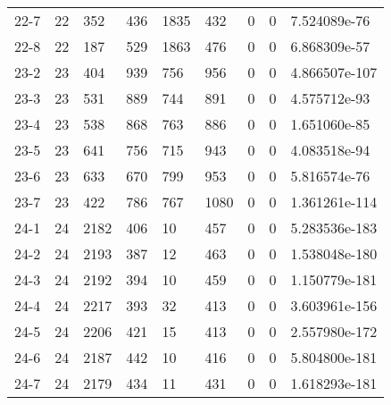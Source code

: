 \documentclass[11pt]{article}
\begin{document}
\begin{tabular}{r|llllllll}
	22-7 & 22            &  352          & 436           & 1835          &  432          & 0             & 0             &  7.524089e-76\\
	22-8 & 22            &  187          & 529           & 1863          &  476          & 0             & 0             &  6.868309e-57\\
	23-2 & 23            &  404          & 939           &  756          &  956          & 0             & 0             & 4.866507e-107\\
	23-3 & 23            &  531          & 889           &  744          &  891          & 0             & 0             &  4.575712e-93\\
	23-4 & 23            &  538          & 868           &  763          &  886          & 0             & 0             &  1.651060e-85\\
	23-5 & 23            &  641          & 756           &  715          &  943          & 0             & 0             &  4.083518e-94\\
	23-6 & 23            &  633          & 670           &  799          &  953          & 0             & 0             &  5.816574e-76\\
	23-7 & 23            &  422          & 786           &  767          & 1080          & 0             & 0             & 1.361261e-114\\
	24-1 & 24            & 2182          & 406           &   10          &  457          & 0             & 0             & 5.283536e-183\\
	24-2 & 24            & 2193          & 387           &   12          &  463          & 0             & 0             & 1.538048e-180\\
	24-3 & 24            & 2192          & 394           &   10          &  459          & 0             & 0             & 1.150779e-181\\
	24-4 & 24            & 2217          & 393           &   32          &  413          & 0             & 0             & 3.603961e-156\\
	24-5 & 24            & 2206          & 421           &   15          &  413          & 0             & 0             & 2.557980e-172\\
	24-6 & 24            & 2187          & 442           &   10          &  416          & 0             & 0             & 5.804800e-181\\
	24-7 & 24            & 2179          & 434           &   11          &  431          & 0             & 0             & 1.618293e-181\\
\end{tabular}
\end{document}
